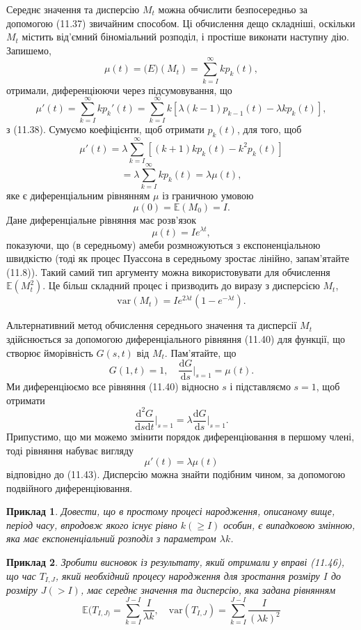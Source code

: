 \documentclass[12pt,fleqn]{article}
\newtheorem{example}{Приклад}[section]
\numberwithin{figure}{section}
\numberwithin{equation}{section}
\begin{document}
Середнє значення та дисперсію $M_t$ можна обчислити безпосередньо за допомогою (11.37) звичайним способом. Ці обчислення дещо складніші, оскільки $M_t$ містить від'ємний біноміальний розподіл, і простіше виконати наступну дію. Запишемо,
$$\mu(t)=\mathbb(E)(M_t)=\sum_{k=I}^{\infty}kp_k(t),$$
отримали, диференціюючи через підсумовування, що
\begin{equation}\label{11.41}
  \mu'(t)=\sum_{k=I}^{\infty}kp_k'(t)=\sum_{k=I}^{\infty}k\left[\lambda(k-1)p_{k-1}(t)-\lambda k p_k(t)\right],
\end{equation}
з (11.38). Сумуємо коефіцієнти, щоб отримати $p_k(t)$, для того, щоб
\begin{equation}\label{11.42}
  \mu'(t)=\lambda\sum_{k=I}^{\infty}\left[(k+1)kp_{k}(t)-k^2p_k(t) \right]
\end{equation}
\begin{equation}\label{11.43}
  = \lambda \sum_{k=I}^{\infty} kp_k(t)=\lambda\mu(t),
\end{equation}
яке є диференціальним рівнянням $\mu$ із граничною умовою
$$\mu(0)=\mathbb{E}(M_0)=I.$$
Дане диференціальне рівняння має розв'язок
$$\mu(t)=Ie^{\lambda t},$$
показуючи, що (в середньому) амеби розмножуються з експоненціальною швидкістю (тоді як процес Пуассона в середньому зростає лінійно, запам'ятайте (11.8)). Такий самий тип аргументу можна використовувати для обчислення $\mathbb{E}(M_{t}^{2})$. Це більш складний процес і призводить до виразу з дисперсією $M_t$,
\begin{equation}\label{11.44}
  \text{var}(M_t)=Ie^{2\lambda t}(1-e^{-\lambda t}).
\end{equation}

Альтернативний метод обчислення середнього значення та дисперсії $M_t$ здійснюється за допомогою диференціального рівняння (11.40) для функції, що створює йморівність $G(s,t)$ від $M_t$. Пам'ятайте, що
$$G(1,t)=1, \quad \frac{\mathrm{d}G}{\mathrm{d}s}\bigg|_{s=1}=\mu(t). $$
Ми диференціюємо все рівняння (11.40) відносно $s$ і підставляємо $s=1$,  щоб отримати
$$\frac{\mathrm{d}^2G}{\mathrm{d}s\mathrm{d}t}\bigg|_{s=1}=\lambda\frac{\mathrm{d}G}{\mathrm{d}s}\bigg|_{s=1}.$$
Припустимо, що ми можемо змінити порядок диференціювання в першому члені, тоді рівняння набуває вигляду
$$\mu'(t)=\lambda\mu(t)$$
відповідно до (11.43). Дисперсію можна знайти подібним чином, за допомогою подвійного диференціювання.

\begin{example}\label{11.46}
  Довести, що в простому процесі народження, описаному вище, період часу, впродовж якого існує рівно $k(\geq I)$ особин, є випадковою змінною, яка має експоненціальний розподіл з параметром $\lambda k$.
\end{example}

\begin{example}\label{11.47}
  Зробити висновок із результату, який отримали у вправі (11.46), що час $T_{I,J}$, який необхідний процесу народження для зростання розміру $I$ до розміру $J (>I)$, має середнє значення та дисперсію, яка задана рівнянням
  $$\mathbb{E}(T_{I,J)}=\sum_{k=I}^{J-I}\frac{I}{\lambda k}, \quad \text{var}(T_{I,J})=\sum_{k=I}^{J-I}\frac{I}{(\lambda k)^2}$$
\end{example}
\end{document}
